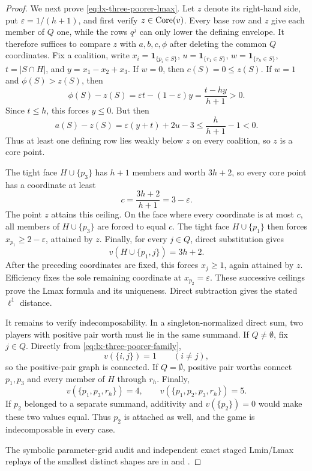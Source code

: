 \begin{proof}
We next prove \eqref{eq:lx-three-poorer-lmax}.  Let $z$ denote its right-hand
side, put $\varepsilon=1/(h+1)$, and first verify $z\in\operatorname{Core}(v)$.  Every base
row and $z$ give each member of $Q$ one, while the rows $q^j$ can only lower
the defining envelope.  It therefore suffices to compare $z$ with
$a,b,c,\phi$ after deleting the common $Q$ coordinates.  Fix a coalition,
write $x_i=\mathbf1_{\{p_i\in S\}}$, $u=\mathbf1_{\{r_1\in S\}}$,
$w=\mathbf1_{\{r_h\in S\}}$, $t=|S\cap H|$, and
$y=x_1-x_2+x_3$.  If $w=0$, then $c(S)=0\leq z(S)$.  If $w=1$ and
$\phi(S)>z(S)$, then
\[
 \phi(S)-z(S)=\varepsilon t-(1-\varepsilon)y
              =\frac{t-hy}{h+1}>0.
\]
Since $t\leq h$, this forces $y\leq0$.  But then
\[
 a(S)-z(S)=\varepsilon(y+t)+2u-3
 \leq\frac{h}{h+1}-1<0.
\]
Thus at least one defining row lies weakly below $z$ on every coalition, so
$z$ is a core point.

The tight face $H\cup\{p_3\}$ has $h+1$ members and worth $3h+2$, so every
core point has a coordinate at least
\[
 c=\frac{3h+2}{h+1}=3-\varepsilon.
\]
The point $z$ attains this ceiling.  On the face where every coordinate is at
most $c$, all members of $H\cup\{p_3\}$ are forced to equal $c$.  The tight
face $H\cup\{p_1\}$ then forces $x_{p_1}\geq2-\varepsilon$, attained by
$z$.  Finally, for every $j\in Q$, direct substitution gives
\[
 v(H\cup\{p_1,j\})=3h+2.
\]
After the preceding coordinates are fixed, this forces $x_j\geq1$, again
attained by $z$.  Efficiency fixes the sole remaining coordinate at
$x_{p_2}=\varepsilon$.  These successive ceilings prove the Lmax formula and
its uniqueness.  Direct subtraction gives the stated $\ell^1$ distance.

It remains to verify indecomposability.  In a singleton-normalized direct
sum, two players with positive pair worth must lie in the same summand.  If
$Q\ne\emptyset$, fix $j\in Q$.  Directly from
\eqref{eq:lx-three-poorer-family},
\[
 v(\{i,j\})=1\qquad(i\ne j),
\]
so the positive-pair graph is connected.  If $Q=\emptyset$, positive pair
worths connect $p_1,p_3$ and every member of $H$ through $r_h$.  Finally,
\[
 v(\{p_1,p_3,r_h\})=4,
 \qquad v(\{p_1,p_2,p_3,r_h\})=5.
\]
If $p_2$ belonged to a separate summand, additivity and $v(\{p_2\})=0$
would make these two values equal.  Thus $p_2$ is attached as well, and the
game is indecomposable in every case.

The symbolic parameter-grid audit and independent exact staged Lmin/Lmax
replays of the smallest distinct shapes are in
 and
.
\end{proof}

